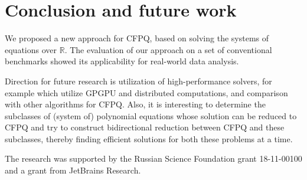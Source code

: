 \documentclass[sigconf]{acmart}
\begin{document}
\section{Conclusion and future work}

We proposed a new approach for CFPQ, based on solving the systems of equations over $\mathbb{R}$.
The evaluation of our approach on a set of conventional benchmarks showed its applicability for real-world data analysis.

Direction for future research is utilization of high-performance solvers, for example which utilize GPGPU and distributed computations, and comparison with other algorithms for CFPQ.
Also, it is interesting to determine the subclasses of (system of) polynomial equations whose solution can be reduced to CFPQ and try to construct bidirectional reduction between CFPQ and these subclasses, thereby finding efficient solutions for both these problems at a time.



\begin{acks}
The research was supported by the Russian Science Foundation grant 18-11-00100 and a grant from JetBrains Research.
\end{acks}




\end{document}
